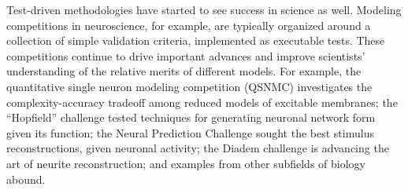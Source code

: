 \documentclass[11pt,letterpaper]{article}
\begin{document}

Test-driven methodologies have started to see success in science as well. Modeling competitions in neuroscience, for example, are typically organized around a collection of simple validation criteria, implemented as executable tests. These competitions continue to drive important advances and improve scientists' understanding of the relative merits of different models. For example, 
the quantitative single neuron modeling competition (QSNMC)\cite{jolivet_quantitative_2008} investigates the complexity-accuracy tradeoff among reduced models of excitable membranes; 
the ``Hopfield'' challenge\cite{hopfield_what_2000} tested techniques for generating neuronal network form given its function; 
the Neural Prediction Challenge sought the best stimulus reconstructions, given neuronal activity\cite{neural_prediction_url}; the Diadem challenge is advancing the art of neurite reconstruction\cite{diadem_url}; and 
examples from other subfields of biology abound\cite{dream_url}.
\end{document}
